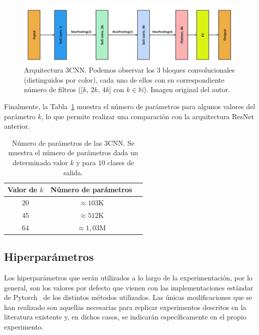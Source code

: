\begin{figure}[h]
    \centering
    \includegraphics[width=0.8\linewidth]{img/experiments/3CNN.png}
    \caption[Arquitectura $3$CNN.]{Arquitectura $3$CNN. Podemos observar los 3 bloques convolucionales (distinguidos por color), cada uno de ellos con su correspondiente número de filtros ([$k$, $2k$, $4k$] con $k \in \mathbb{N}$). Imagen original del autor.}\label{fig:3CNN}
\end{figure}

Finalmente, la Tabla~\ref{tab:numero-parametros3cnn} muestra el número de parámetros para algunos valores del parámetro $k$, lo que permite realizar una comparación con la arquitectura ResNet anterior.

\begin{table}[ht]
    \centering
    \begin{tabular}{|c|c|c|}
    \hline
    \textbf{Valor de $k$}           & \textbf{Número de parámetros}                     
    \\ \hline
    $20$                  & $\approx 103$\space K                                            \\ \hline
    $45$                  & $\approx 512$\space K                                             \\ \hline
    $64$                  & $\approx 1,03$\space M                                             \\ \hline
    \end{tabular}
    \caption[Número de parámetros de las arquitecturas $3$CNN.]{Número de parámetros de las $3$CNN. Se muestra el número de parámetros dada un determinado valor $k$ y para $10$ clases de salida.}\label{tab:numero-parametros3cnn}
\end{table}

\subsection{Hiperparámetros}\label{subsec:hiperparametros}

Los hiperparámetros que serán utilizados a lo largo de la experimentación, por lo general, son los valores por defecto que vienen con las implementaciones estándar de Pytorch~\cite{NEURIPS2019_9015} de los distintos métodos utilizados. Las únicas modificaciones que se han realizado son aquellas necesarias para replicar experimentos descritos en la literatura existente y, en dichos casos, se indicarán específicamente en el propio experimento.\newline

